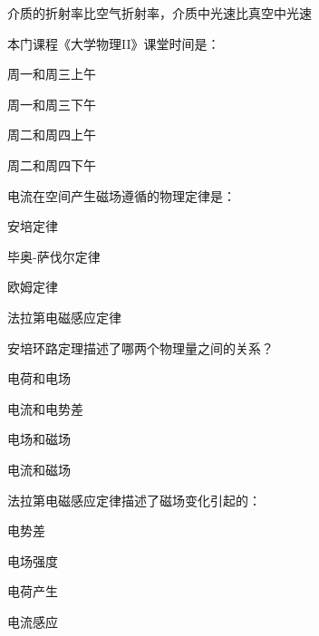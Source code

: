 \documentclass{njustexam}
\begin{document}
\begin{problem}
介质的折射率比空气折射率，介质中光速比真空中光速
\end{problem}



\begin{problem}

  本门课程《大学物理II》课堂时间是：
  \begin{abcd}
    \item 周一和周三上午
    \item 周一和周三下午
    \item 周二和周四上午
    \item 周二和周四下午
  \end{abcd}
\end{problem} 

\begin{problem}
  电流在空间产生磁场遵循的物理定律是：
  \begin{abcd}
    \item 安培定律
    \item 毕奥-萨伐尔定律
    \item 欧姆定律
    \item 法拉第电磁感应定律
  \end{abcd}
  \end{problem} 

\begin{problem}

  安培环路定理描述了哪两个物理量之间的关系？
  \begin{abcd}
\item 电荷和电场
\item 电流和电势差
\item 电场和磁场
\item 电流和磁场
  \end{abcd}
  \end{problem}

  \begin{problem}

    法拉第电磁感应定律描述了磁场变化引起的：
    \begin{abcd}
      \item 电势差
      \item 电场强度
      \item 电荷产生
      \item 电流感应
    \end{abcd}
    \end{problem}
\end{document}
